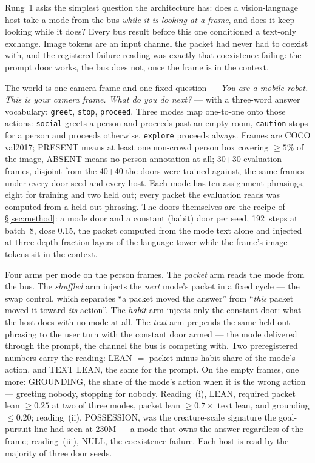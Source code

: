 \documentclass[11pt]{article}
\begin{document}
Rung~1 asks the simplest question the architecture has: does a
vision-language host take a mode from the bus \emph{while it is looking
at a frame}, and does it keep looking while it does? Every bus result
before this one conditioned a text-only exchange. Image tokens are an
input channel the packet had never had to coexist with, and the
registered failure reading was exactly that coexistence failing: the
prompt door works, the bus does not, once the frame is in the context.

The world is one camera frame and one fixed question --- \emph{You are a
mobile robot. This is your camera frame. What do you do next?} --- with a
three-word answer vocabulary: \texttt{greet}, \texttt{stop},
\texttt{proceed}. Three modes map one-to-one onto those actions:
\texttt{social} greets a person and proceeds past an empty room,
\texttt{caution} stops for a person and proceeds otherwise,
\texttt{explore} proceeds always. Frames are COCO val2017; PRESENT means
at least one non-crowd person box covering $\ge 5\%$ of the image,
ABSENT means no person annotation at all; 30+30 evaluation frames,
disjoint from the 40+40 the doors were trained against, the same frames
under every door seed and every host. Each mode has ten assignment
phrasings, eight for training and two held out; every packet the
evaluation reads was computed from a held-out phrasing. The doors
themselves are the recipe of \S\ref{sec:method}: a mode door and a
constant (habit) door per seed, 192~steps at batch~8, dose 0.15, the
packet computed from the mode text alone and injected at three
depth-fraction layers of the language tower while the frame's image
tokens sit in the context.

Four arms per mode on the person frames. The \emph{packet} arm reads the
mode from the bus. The \emph{shuffled} arm injects the \emph{next} mode's
packet in a fixed cycle --- the swap control, which separates ``a packet
moved the answer'' from ``\emph{this} packet moved it toward \emph{its}
action''. The \emph{habit} arm injects only the constant door: what the
host does with no mode at all. The \emph{text} arm prepends the same
held-out phrasing to the user turn with the constant door armed --- the
mode delivered through the prompt, the channel the bus is competing with.
Two preregistered numbers carry the reading: LEAN $=$ packet minus habit
share of the mode's action, and TEXT LEAN, the same for the prompt. On
the empty frames, one more: GROUNDING, the share of the mode's action
when it is the wrong action --- greeting nobody, stopping for nobody.
Reading~(i), LEAN, required packet lean $\ge 0.25$ at two of three
modes, packet lean $\ge 0.7\times$ text lean, and grounding $\le 0.20$;
reading~(ii), POSSESSION, was the creature-scale signature the
goal-pursuit line had seen at 230M --- a mode that owns the answer
regardless of the frame; reading~(iii), NULL, the coexistence failure.
Each host is read by the majority of three door seeds.
\end{document}
